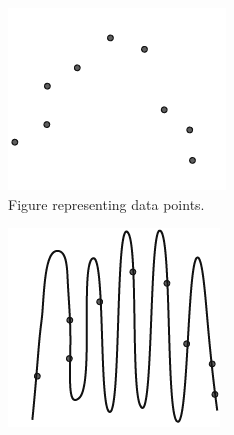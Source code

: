 \begin{figure}[ht]
\centering
\begin{subfigure}[b]{0.24\textwidth}
\centering
\includegraphics[width=\textwidth]{polymOverfitEmpty}
\caption{Figure representing data points.}\label{fig:polymOverfitEmpty}
\end{subfigure}
\hfill
\begin{subfigure}[b]{0.24\textwidth}
\centering
\includegraphics[width=\textwidth]{polymOverfit}

\end{subfigure}
\end{figure}
